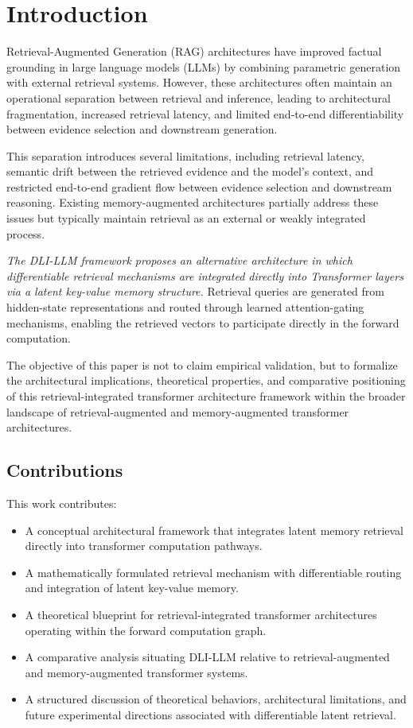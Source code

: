 \hypertarget{introduction}{%
\section{Introduction}
\label{introduction}}

Retrieval-Augmented Generation (RAG) architectures have improved factual grounding in large language models (LLMs) by combining parametric generation with external retrieval systems. However, these architectures often maintain an operational separation between retrieval and inference, leading to architectural fragmentation, increased retrieval latency, and limited end-to-end differentiability between evidence selection and downstream generation.

This separation introduces several limitations, including retrieval latency, semantic drift between the retrieved evidence and the model's context, and restricted end-to-end gradient flow between evidence selection and downstream reasoning. Existing memory-augmented architectures partially address these issues but typically maintain retrieval as an external or weakly integrated process.

\emph{The DLI-LLM framework proposes an alternative architecture in which differentiable retrieval mechanisms are integrated directly into Transformer layers via a latent key-value memory structure.} Retrieval queries are generated from hidden-state representations and routed through learned attention-gating mechanisms, enabling the retrieved vectors to participate directly in the forward computation.

The objective of this paper is not to claim empirical validation, but to formalize the architectural implications, theoretical properties, and comparative positioning of this retrieval-integrated transformer architecture framework within the broader landscape of retrieval-augmented and memory-augmented transformer architectures.

\hypertarget{contributions}{%
\subsection{Contributions}}
\label{contributions}

This work contributes:

\begin{itemize}
\item  A conceptual architectural framework that integrates latent memory retrieval directly into transformer computation pathways.
\item  A mathematically formulated retrieval mechanism with differentiable routing and integration of latent key-value memory.
\item  A theoretical blueprint for retrieval-integrated transformer architectures operating within the forward computation graph.
\item  A comparative analysis situating DLI-LLM relative to retrieval-augmented and memory-augmented transformer systems.
\item  A structured discussion of theoretical behaviors, architectural limitations, and future experimental directions associated with differentiable latent retrieval.
\end{itemize}

